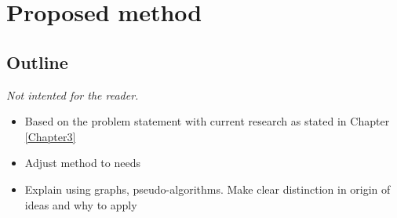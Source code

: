 
\chapter{Proposed method}

\label{Chapter4} %


\section{Outline}
\emph{Not intented for the reader.}
\begin{itemize}
  \item Based on the problem statement with current research as stated in Chapter \ref{Chapter3}
  \item Adjust method to needs
  \item Explain using graphs, pseudo-algorithms. Make clear distinction in origin of ideas and why to apply
\end{itemize}